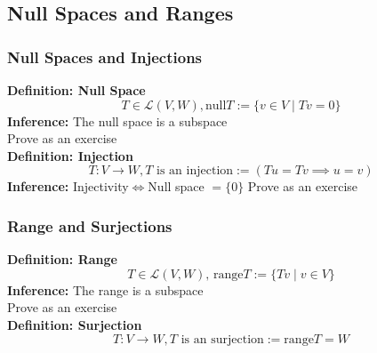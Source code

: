 \documentclass{article}
\newcommand{\0}{{\bf{0}}}
\begin{document}
\subsection{Null Spaces and Ranges}
\subsubsection{Null Spaces and Injections}
\textbf{Definition: Null Space}
$$T\in\mathcal{L}(V,W),\mbox{null}T:=\{v\in V\mid Tv=0\}$$
\textbf{Inference:} The null space is a subspace\\
\null\hfill{Prove as an exercise}\\
\textbf{Definition: Injection}
$$T:V\to W,T\mbox{ is an injection}:=(Tu=Tv\implies u=v)$$
\textbf{Inference:} Injectivity$\iff$Null space $=\{0\}$
\null\hfill{Prove as an exercise}
\subsubsection{Range and Surjections}
\textbf{Definition: Range}
$$T\in\mathcal{L}(V,W),\,\mbox{range}T:=\{Tv\mid v\in V\}$$
\textbf{Inference:} The range is a subspace\\
\null\hfill{Prove as an exercise}\\
\textbf{Definition: Surjection}
$$T:V\to W,T\mbox{ is an surjection}:=\mbox{range}T=W$$
\end{document}
